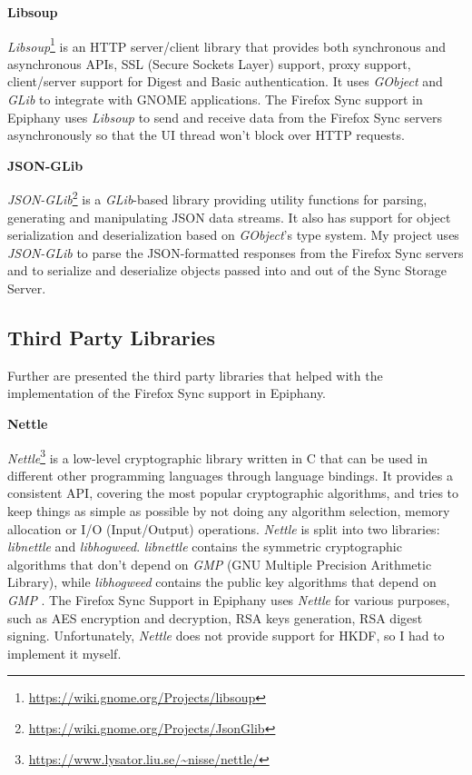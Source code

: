 \textbf{Libsoup}

\textit{Libsoup}\footnote{\url{https://wiki.gnome.org/Projects/libsoup}} is an HTTP server/client library that provides both synchronous and asynchronous APIs, SSL (Secure Sockets Layer) support, proxy support, client/server support for Digest and Basic authentication. It uses \textit{GObject} and \textit{GLib} to integrate with GNOME applications. The Firefox Sync support in Epiphany uses \textit{Libsoup} to send and receive data from the Firefox Sync servers asynchronously so that the UI thread won't block over HTTP requests.

\textbf{JSON-GLib}

\textit{JSON-GLib}\footnote{\url{https://wiki.gnome.org/Projects/JsonGlib}} is a \textit{GLib}-based library providing utility functions for parsing, generating and manipulating JSON data streams. It also has support for object serialization and deserialization based on \textit{GObject}'s type system. My project uses \textit{JSON-GLib} to parse the JSON-formatted responses from the Firefox Sync servers and to serialize and deserialize objects passed into and out of the Sync Storage Server.

\subsection{Third Party Libraries}
\label{sub-sec:thirs-party-libraries}

Further are presented the third party libraries that helped with the implementation of the Firefox Sync support in Epiphany.

\textbf{Nettle}

\textit{Nettle}\footnote{\url{https://www.lysator.liu.se/~nisse/nettle/}} is a low-level cryptographic library written in C that can be used in different other programming languages through language bindings. It provides a consistent API, covering the most popular cryptographic algorithms, and tries to keep things as simple as possible by not doing any algorithm selection, memory allocation or I/O (Input/Output) operations. \textit{Nettle} is split into two libraries: \textit{libnettle} and \textit{libhogweed}. \textit{libnettle} contains the symmetric cryptographic algorithms that don't depend on \textit{GMP} (GNU Multiple Precision Arithmetic Library), while \textit{libhogweed} contains the public key algorithms that depend on \textit{GMP} \cite{moller2001nettle}. The Firefox Sync Support in Epiphany uses \textit{Nettle} for various purposes, such as AES encryption and decryption, RSA keys generation, RSA digest signing. Unfortunately, \textit{Nettle} does not provide support for HKDF, so I had to implement it myself.


